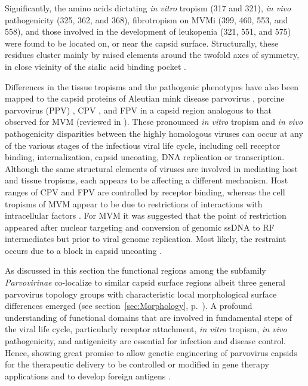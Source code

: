 	
	Significantly, the amino acids dictating \textit{in vitro} tropism (317 and 321), \textit{in vivo} pathogenicity (325, 362, and 368), fibrotropism on MVMi (399, 460, 553, and 558), and those involved in the development of leukopenia (321, 551, and 575) were found to be located on, or near the capsid surface. Structurally, these residues cluster mainly by raised elements around the twofold axes of symmetry, in close vicinity of the sialic acid binding pocket \cite{pmid16415031, pmid18045943}.   
	
Differences in the tissue tropisms and the pathogenic phenotypes  have also been mapped to the capsid proteins of Aleutian mink disease parvovirus \cite{pmid8396664}, porcine parvovirus (PPV)  \cite{pmid8642680}, CPV \cite{pmid3176341, pmid1331498}, and FPV \cite{pmid7513918} in a capsid region analogous to that observed for MVM (reviewed in \cite{tropism}). These pronounced \textit{in vitro} tropism and \textit{in vivo} pathogenicity disparities between the highly homologous viruses can occur at any of the various stages of the infectious viral life cycle, including cell receptor binding, internalization, capsid uncoating, DNA replication or transcription. Although the same structural elements of viruses are involved in mediating host and tissue tropisms, each appears to be affecting a different mechanism. Host ranges of CPV and FPV are controlled by receptor binding, whereas the cell tropisms of MVM appear to be due to restrictions of interactions with intracellular factors \cite{pmid9817841, pmid12941411, pmid6602221}. For MVM it was suggested that the point of restriction appeared after nuclear targeting and conversion of genomic ssDNA to RF intermediates but prior to viral genome replication. Most likely, the restraint occurs due to a block in capsid uncoating \cite{pmid9311862, pmid1322591}.

As discussed in this section the functional regions among the subfamily \textit{Parvovirinae} co-localize to similar capsid surface regions albeit three general parvovirus topology groups with characteristic local morphological surface differences emerged (see section~\ref{sec:Morphology}, p.~\pageref{sec:Morphology}). A profound understanding of functional domains that are involved in fundamental steps of the viral life cycle, particularly receptor attachment, \textit{in vitro} tropism, \textit{in vivo} pathogenicity, and antigenicity are essential for infection and disease control. Hence, showing great promise to allow genetic engineering of parvovirus capsids for the therapeutic delivery to be controlled or modified in gene therapy applications and to develop foreign antigens \cite{pmid12941411, tropism}.     



